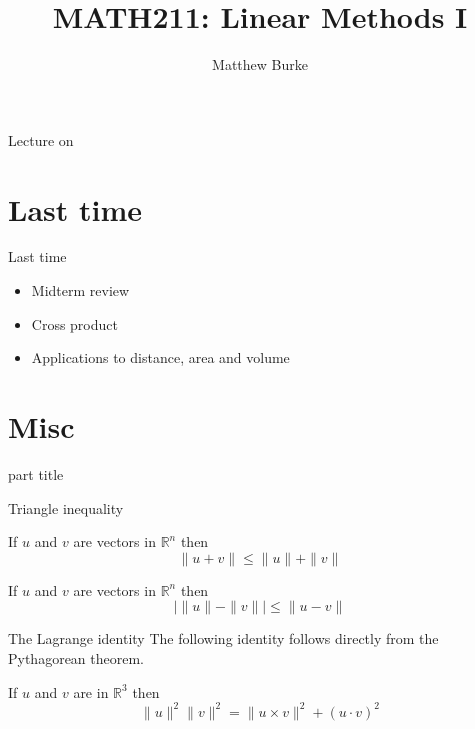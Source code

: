 \documentclass{beamer}
\title{MATH211: Linear Methods I}
\author{Matthew Burke}
\date{\lectureDate}
\newcommand{\lectureDate}{\formatdate{25}{10}{2018}}
\begin{document}
\frame{\titlepage}

\begin{frame}{Lecture on \lectureDate}
  \tableofcontents
\end{frame}

\section*{Last time}
\label{sec:Last-time}

\begin{frame}{Last time}
  \begin{itemize}
  \item Midterm review\vfill
  \item Cross product\vfill
  \item Applications to distance, area and volume\vfill
  \end{itemize}
\end{frame}

\section{Misc}

\begin{frame}
\begin{beamercolorbox}[sep=12pt,center]{part title}
\insertsection\par
\end{beamercolorbox}
\end{frame}

\begin{frame}{Triangle inequality}
\begin{theorem}
  If $u$ and $v$ are vectors in $\mathbb{R}^n$ then
  \begin{equation*}
    \|u+v\| \leq \|u\|+\|v\|
  \end{equation*}
\end{theorem}\vfill
\begin{theorem}
  If $u$ and $v$ are vectors in $\mathbb{R}^n$ then
  \begin{equation*}
    |\|u\|-\|v\||\leq \|u-v\|
  \end{equation*}
\end{theorem}
\end{frame}

\begin{frame}{The Lagrange identity}
The following identity follows directly from the Pythagorean theorem.
\begin{theorem}
If $u$ and $v$ are in $\mathbb{R}^3$ then
\begin{equation*}
\|u\|^2\|v\|^2 = \|u\times v\|^2 + (u\cdot v)^2
\end{equation*}
\end{theorem}
\end{frame}
\end{document}
